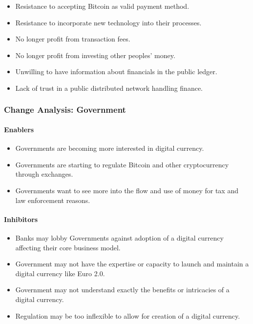 \documentclass[12pt]{article} %
\begin{document}
{\begin{itemize}
	\item Resistance to accepting Bitcoin as valid payment method.
	\item Resistance to incorporate new technology into their processes.
	\item No longer profit from transaction fees.
	\item No longer profit from investing other peoples' money.
	\item Unwilling to have information about financials in the public ledger.
	\item Lack of trust in a public distributed network handling finance.
\end{itemize}

\subsubsection{Change Analysis: Government} \label{sssec:4.5:government}

\paragraph*{Enablers}

\begin{itemize}
	\item Governments are becoming more interested in digital currency.
	\item Governments are starting to regulate Bitcoin and other cryptocurrency through exchanges.
	\item Governments want to see more into the flow and use of money for tax and law enforcement reasons.
\end{itemize}

\paragraph*{Inhibitors}

\begin{itemize}
	\item Banks may lobby Governments against adoption of a digital currency affecting their core business model.
	\item Government may not have the expertise or capacity to launch and maintain a digital currency like Euro 2.0.
	\item Government may not understand exactly the benefits or intricacies of a digital currency.
	\item Regulation may be too inflexible to allow for creation of a digital currency.
\end{itemize}

}
\end{document}
